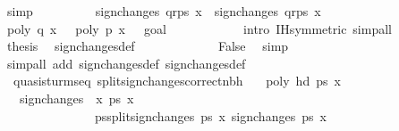 \begin{isabellebody}
\ simp\isanewline
\ \ \ \ \ \ \isamarkupfalse%
\ \isamarkupfalse%
\ {\isachardoublequoteopen}sign{\isacharunderscore}changes\ {\isacharparenleft}q{\isacharhash}r{\isacharhash}ps{\isacharparenright}\ x\ {\isacharequal}\ sign{\isacharunderscore}changes{\isacharprime}\ {\isacharparenleft}q{\isacharhash}r{\isacharhash}ps{\isacharparenright}\ x\isanewline
\ \ \ \ \ \ \ \ \ \ \isamarkupfalse%
\ {\isacharbackquoteopen}poly\ q\ x\ {\isasymnoteq}\ {}{\isacharbackquoteclose}\ {\isacharbackquoteopen}poly\ p\ x\ {\isasymnoteq}\ {}{\isacharbackquoteclose}\ goal{}{\isacharparenleft}{}{\isacharparenright}\isanewline
\ \ \ \ \ \ \ \ \ \ \isamarkupfalse%
\ {\isacharparenleft}intro\ IH{\isacharparenleft}{}{\isacharparenright}{\isacharbrackleft}symmetric{\isacharbrackright}{\isacharcomma}\ simp{\isacharunderscore}all{\isacharparenright}\isanewline
\ \ \ \ \ \ \isamarkupfalse%
\ \isamarkupfalse%
\ {\isacharquery}thesis\ \isamarkupfalse%
\ sign{\isacharunderscore}changes{\isacharprime}{\isacharunderscore}def\ \isanewline
\ \ \ \ \ \ \ \ \ \ \isamarkupfalse%
\ False\ \isamarkupfalse%
\ simp\isanewline
\ \ \ \ \isamarkupfalse%
\isanewline
{}\isamarkupfalse%
\ {\isacharparenleft}simp{\isacharunderscore}all\ add{\isacharcolon}\ sign{\isacharunderscore}changes{\isacharunderscore}def\ sign{\isacharunderscore}changes{\isacharprime}{\isacharunderscore}def{\isacharparenright}%
\endisatagproof
{\isafoldproof}%
%
\isadelimproof
\isanewline
%
\endisadelimproof
\isanewline
\isanewline
\isanewline
{}\isamarkupfalse%
\ {\isacharparenleft}\ quasi{\isacharunderscore}sturm{\isacharunderscore}seq{\isacharparenright}\ split{\isacharunderscore}sign{\isacharunderscore}changes{\isacharunderscore}correct{\isacharunderscore}nbh{\isacharcolon}\isanewline
\ \ \ {\isachardoublequoteopen}poly\ {\isacharparenleft}hd\ ps{\isacharparenright}\ x\ {\isasymnoteq}\ {}{\isachardoublequoteclose}\isanewline
\ \ \ {\isachardoublequoteopen}sign{\isacharunderscore}changes{\isacharprime}\ {\isasymequiv}\ {\isasymlambda}x\ ps\ x{\isachardot}\ \isanewline
\ \ \ \ \ \ \ \ \ \ \ \ \ \ \ {\isasymSum}ps{\isacharprime}{\isasymleftarrow}split{\isacharunderscore}sign{\isacharunderscore}changes\ ps\ x\ sign{\isacharunderscore}changes\ ps{\isacharprime}\ x{\isachardoublequoteclose}\isanewline

\end{isabellebody}
